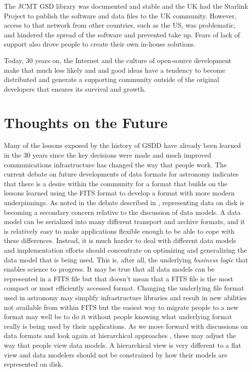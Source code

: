 \documentclass[final,authoryear,5p,times,twocolumn]{elsarticle}
\begin{document}
The JCMT GSD library was documented and stable and the UK had the
Starlink Project \citep{1982QJRAS..23..485D} to publish the software
and data files to the UK community. However, access to that network from other
countries, such as the US, was problematic, and hindered the spread of
the software and prevented take up. Fears of lack of support also
drove people to create their own in-house solutions.

Today, 30 years on, the Internet and the culture of open-source
development make that much less likely and
and good ideas have a tendency to become distributed and generate a
supporting community outside of the original developers that ensures
its survival and growth.

\section{Thoughts on the Future}

Many of the lessons exposed by the history of GSDD have already been
learned in the 30 years since the key decisions were made and much
improved communications infrastructure has changed the way that people
work.  The current debate on future developments of data formats for
astronomy \citep[see e.g.][]{2015Thomas,2015Mink,2015MinkADASS}
indicates that there is a desire within the community for a format
that builds on the lessons learned using the FITS format to develop a
format with more modern underpinnings.  As noted in the debate
described in \citet{2015MinkADASS}, representing data on disk is
becoming a secondary concern relative to the discussion of data
models. A data model can be serialized into many different transport
and archive formats, and
it is relatively easy to make applications flexible enough to be
able to cope with these differences. Instead, it is much harder to
deal with different data models and implementation efforts should
concentrate on optimizing and generalizing the data model that is
being used. This is, after all,
the underlying \emph{business logic} that enables science to progress.
It may be true that all data models can be represented in a FITS file
but that doesn't mean that a FITS file is the most compact or most
efficiently accessed format. Changing the underlying file format used
in astronomy may simplify infrastructure libraries and result in new
abilities not available from within FITS but the easiest way to
migrate people to a new format may well be to do it without people
knowing what underlying format really is being used by their
applications.  As we move forward with discussions on data formats and
look again at hierarchical approaches
\citep[e.g.][]{2015Price,2015HDS,2015ASDF}, these may adjust the way
that people view data models. A hierarchical view is very different to
a flat view and data modelers should not be constrained by how their
models are represented on disk.
\end{document}
